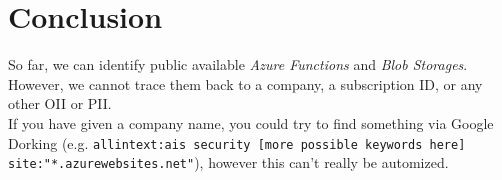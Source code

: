 \documentclass[12pt]{article}
\begin{document}
\section*{Conclusion}
So far, we can identify public available \textit{Azure Functions} and \textit{Blob Storages}. However, we cannot trace them back to a company, a subscription ID, or any other OII or PII.\\
If you have given a company name, you could try to find something via Google Dorking (e.g. \verb|allintext:ais security [more possible keywords here] site:"*.azurewebsites.net"|), however this can't really be automized.
\end{document}
